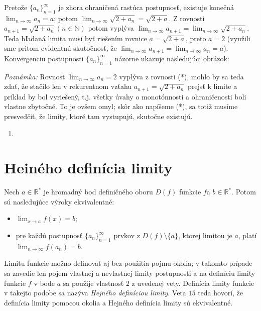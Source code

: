 Pretože ${\{a_n\}}_{n=1}^\infty$ je zhora ohraničená rastúca postupnosť, existuje konečná $\lim_{n \rightarrow \infty} a_n=a$; potom $\lim_{n \rightarrow \infty}\sqrt{2+a_n}=\sqrt{2+a}$. Z rovnosti $a_{n+1}=\sqrt{2+a_n} (n \in \mathbb{N})$ potom vyplýva $\lim_{n \rightarrow \infty} a_{n+1}=\lim_{n \rightarrow \infty} \sqrt{2+a_n}$. Teda hľadaná limita musí byť riešením rovnice $a=\sqrt{2+a}$, preto $a=2$ (využili sme pritom evidentnú skutočnosť, že $\lim_{n \rightarrow \infty} a_{n+1}=\lim_{n \rightarrow \infty} a_n=a$). Konvergenciu postupnosti ${\{a_n\}}_{n=1}^\infty$ názorne ukazuje nasledujúci obrázok:

\textit{Poznámka:}
Rovnosť $\lim_{n \rightarrow \infty} a_n=2$ vyplýva z rovnosti (*), mohlo by sa teda zdať, že stačilo len v rekurentnom vzťahu $a_{n+1}=\sqrt{2+a_n}$ prejsť k limite a príklad by bol vyriešený, t.j. všetky úvahy o monotónnosti a ohraničenosti boli vlastne zbytočné. To je ovšem omyl; skôr ako napíšeme (*), sa totiž musíme presvedčiť, že limity, ktoré tam vystupujú, skutočne existujú.

\begin{enumerate}[resume]
  \item {}
\end{enumerate}

\section{Heiného definícia limity}
\begin{veta}
Nech $a \in \mathbb{R^*}$ je hromadný bod definičného oboru $D(f)$ funkcie $f$a $b \in \mathbb{R^*}$. Potom sú nasledujúce výroky ekvivalentné:
\begin{itemize}
\item $\lim_{x \rightarrow a} f(x)=b$;
\item pre každú postupnosť ${\{a_n\}}_{n=1}^\infty$ prvkov z $D(f)\setminus \{ a\}$, ktorej limitou je $a$, platí $\lim_{n \rightarrow \infty} f(a_n)=b$.
\end{itemize}
\end{veta}

Limitu funkcie možno definovať aj bez použitia pojmu okolia; v takomto prípade sa zavedie len pojem vlastnej a nevlastnej limity postupnosti a na definíciu limity funkcie $f$ v bode $a$ sa použije vlastnosť $2$ z uvedenej vety. Definícia limity funkcie v takejto podobe sa nazýva \textit{Hejného definíciou limity}. Veta $15$ teda hovorí, že definícia limity pomocou okolia a Hejného definícia limity sú ekvivalentné.

